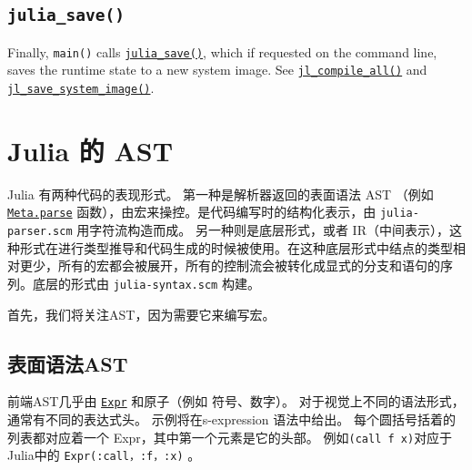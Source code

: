 \hypertarget{6367994784846959684}{}


\subsection{\texttt{julia\_save()}}



Finally, \texttt{main()} calls \href{https://github.com/JuliaLang/julia/blob/master/src/init.c}{\texttt{julia\_save()}}, which if requested on the command line, saves the runtime state to a new system image. See \href{https://github.com/JuliaLang/julia/blob/master/src/gf.c}{\texttt{jl\_compile\_all()}} and \href{https://github.com/JuliaLang/julia/blob/master/src/staticdata.c}{\texttt{jl\_save\_system\_image()}}.



\hypertarget{13955728449382648563}{}


\section{Julia 的 AST}



Julia 有两种代码的表现形式。 第一种是解析器返回的表面语法 AST （例如 \hyperlink{9794549254908071788}{\texttt{Meta.parse}} 函数），由宏来操控。是代码编写时的结构化表示，由 \texttt{julia-parser.scm} 用字符流构造而成。 另一种则是底层形式，或者 IR（中间表示），这种形式在进行类型推导和代码生成的时候被使用。在这种底层形式中结点的类型相对更少，所有的宏都会被展开，所有的控制流会被转化成显式的分支和语句的序列。底层的形式由 \texttt{julia-syntax.scm} 构建。



首先，我们将关注AST，因为需要它来编写宏。



\hypertarget{16689812133917537196}{}


\subsection{表面语法AST}



前端AST几乎由 \hyperlink{17120496304147995299}{\texttt{Expr}} 和原子（例如 符号、数字）。 对于视觉上不同的语法形式，通常有不同的表达式头。 示例将在s-expression 语法中给出。 每个圆括号括着的列表都对应着一个 Expr，其中第一个元素是它的头部。 例如\texttt{(call f x)}对应于Julia中的 \texttt{Expr(:call，:f，:x)} 。



